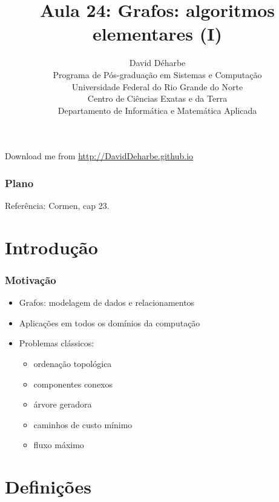 \documentclass{beamer}
\title{Aula 24: Grafos: algoritmos elementares (I)}
\author{David Déharbe \\
  Programa de Pós-graduação em Sistemas e Computação \\
  Universidade Federal do Rio Grande do Norte \\
  Centro de Ciências Exatas e da Terra \\
  Departamento de Informática e Matemática Aplicada}
\date{}
\begin{document}

\begin{frame}
  \titlepage

  Download me from \url{http://DavidDeharbe.github.io}

\end{frame}

\begin{frame}
  \frametitle{Plano}
  \tableofcontents

Referência: Cormen, cap 23.
\end{frame}

\section{Introdução}

\begin{frame}
\frametitle{Motivação}

\begin{itemize}
\item Grafos: modelagem de dados e relacionamentos 
\item Aplicações em todos os domínios da computação
\item Problemas clássicos: 
\begin{itemize}
\item ordenação topológica
\item componentes conexos
\item árvore geradora
\item caminhos de custo mínimo 
\item fluxo máximo
\end{itemize}
\end{itemize}
\end{frame}

\section{Definições}
\end{document}

